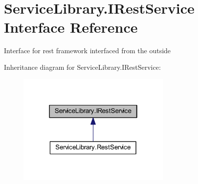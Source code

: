 \hypertarget{interface_service_library_1_1_i_rest_service}{\section{Service\-Library.\-I\-Rest\-Service Interface Reference}
\label{interface_service_library_1_1_i_rest_service}
}


Interface for rest framework interfaced from the outside  




Inheritance diagram for Service\-Library.\-I\-Rest\-Service\-:\nopagebreak
\begin{figure}[H]
\begin{center}
\leavevmode
\includegraphics[width=214pt]{interface_service_library_1_1_i_rest_service__inherit__graph}
\end{center}
\end{figure}
